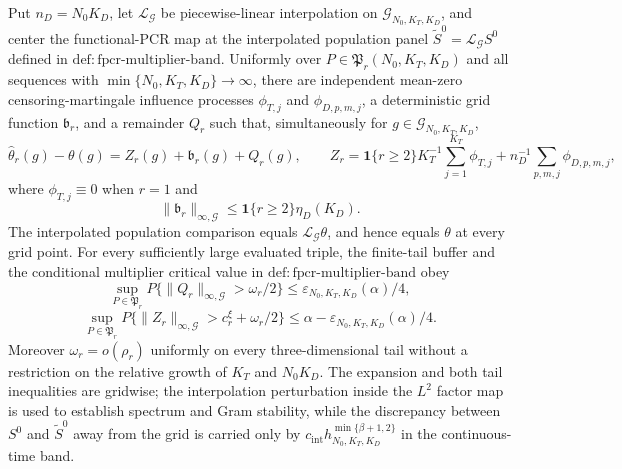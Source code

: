 Put \(n_D=N_0K_D\), let \(\mathcal L_{\mathcal G}\) be piecewise-linear interpolation on \(\mathcal G_{N_0,K_T,K_D}\), and center the functional-PCR map at the interpolated population panel \(\widetilde S^0=\mathcal L_{\mathcal G}S^0\) defined in \(\mathrm{def:fpcr\mbox{-}multiplier\mbox{-}band}\). Uniformly over \(P\in\mathfrak P_r(N_0,K_T,K_D)\) and all sequences with \(\min\{N_0,K_T,K_D\}\to\infty\), there are independent mean-zero censoring-martingale influence processes \(\phi_{T,j}\) and \(\phi_{D,p,m,j}\), a deterministic grid function \(\mathfrak b_r\), and a remainder \(Q_r\) such that, simultaneously for \(g\in\mathcal G_{N_0,K_T,K_D}\),
\[
 \widehat\theta_r(g)-\theta(g)=Z_r(g)+\mathfrak b_r(g)+Q_r(g),
 \qquad
 Z_r=\mathbf 1\{r\ge2\}K_T^{-1}\sum_{j=1}^{K_T}\phi_{T,j}
     +n_D^{-1}\sum_{p,m,j}\phi_{D,p,m,j},
\]
where \(\phi_{T,j}\equiv0\) when \(r=1\) and
\[
 \|\mathfrak b_r\|_{\infty,\mathcal G}
 \le \mathbf 1\{r\ge2\}\eta_D(K_D).
\]
The interpolated population comparison equals \(\mathcal L_{\mathcal G}\theta\), and hence equals \(\theta\) at every grid point. For every sufficiently large evaluated triple, the finite-tail buffer and the conditional multiplier critical value in \(\mathrm{def:fpcr\mbox{-}multiplier\mbox{-}band}\) obey
\[
 \sup_{P\in\mathfrak P_r}P\{\|Q_r\|_{\infty,\mathcal G}>\omega_r/2\}
 \le\varepsilon_{N_0,K_T,K_D}(\alpha)/4,
\]
\[
 \sup_{P\in\mathfrak P_r}P\{\|Z_r\|_{\infty,\mathcal G}>c_r^\xi+\omega_r/2\}
 \le\alpha-\varepsilon_{N_0,K_T,K_D}(\alpha)/4.
\]
Moreover \(\omega_r=o(\rho_r)\) uniformly on every three-dimensional tail without a restriction on the relative growth of \(K_T\) and \(N_0K_D\). The expansion and both tail inequalities are gridwise; the interpolation perturbation inside the \(L^2\) factor map is used to establish spectrum and Gram stability, while the discrepancy between \(S^0\) and \(\widetilde S^0\) away from the grid is carried only by \(c_{\mathrm{int}}h_{N_0,K_T,K_D}^{\min\{\beta+1,2\}}\) in the continuous-time band.
